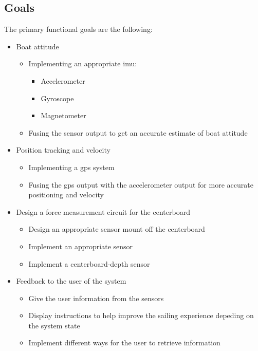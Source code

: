 \subsection{Goals}
The primary functional goals are the following:
\begin{itemize}[noitemsep] %
	\item Boat attitude
	\begin{itemize}[noitemsep]
		\item Implementing an appropriate \gls{imu}:
		\begin{itemize}[noitemsep]
			\item Accelerometer
			\item Gyroscope
			\item Magnetometer
		\end{itemize}
		\item Fusing the sensor output to get an accurate estimate of boat attitude
	\end{itemize}
	\item Position tracking and velocity
	\begin{itemize}[noitemsep]
		\item Implementing a \gls{gps} system
		\item Fusing the \gls{gps} output with the accelerometer output for more accurate positioning and velocity
	\end{itemize}
	\item Design a force measurement circuit for the centerboard
	\begin{itemize}[noitemsep]
		\item Design an appropriate sensor mount off the centerboard
		\item Implement an appropriate sensor
		\item Implement a centerboard-depth sensor
	\end{itemize}
	\item  Feedback to the user of the system
	\begin{itemize}[noitemsep]
		\item Give the user information from the sensors
		\item Display instructions to help improve the sailing experience depeding on the system state
		\item Implement different ways for the user to retrieve information
	\end{itemize}
\end{itemize}

